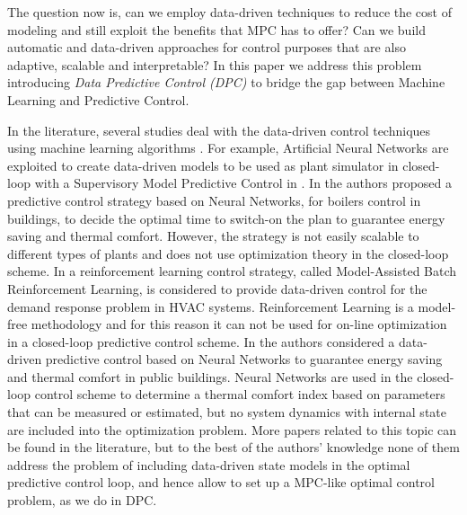 	
The question now is, can we employ data-driven techniques to reduce the cost of modeling and still exploit the benefits that MPC has to offer? Can we build automatic and data-driven approaches for control purposes that are also adaptive, scalable and interpretable? In this paper we address this problem introducing \textit{Data Predictive Control (DPC)} to bridge the gap between Machine Learning and Predictive Control.

In the literature, several studies deal with the data-driven control techniques using machine learning algorithms \cite{Hou2013}. For example, Artificial Neural Networks are exploited to create data-driven models to be used as plant simulator in closed-loop with a Supervisory Model Predictive Control in \cite{Afram2017}. In \cite{Macarulla2017} the authors proposed a predictive control strategy based on Neural Networks, for boilers control in buildings, to decide the optimal time to switch-on the plan to guarantee energy saving and thermal comfort. However, the strategy is not easily scalable to different types of plants and does not use optimization theory in the closed-loop scheme. In \cite{Costanzo2016} a reinforcement learning control strategy, called Model-Assisted Batch Reinforcement Learning, is considered to provide data-driven control for the demand response problem in HVAC systems. Reinforcement Learning is a model-free methodology and for this reason it can not be used for on-line optimization in a closed-loop predictive control scheme. In \cite{Ferreira2012} the authors considered a data-driven predictive control based on Neural Networks to guarantee energy saving and  thermal comfort in public buildings. Neural Networks are used in the closed-loop control scheme to determine a thermal comfort index based on parameters that can be measured or estimated, but no  system dynamics with internal state are included into the optimization problem. More papers related to this topic can be found in the literature, but to the best of the authors' knowledge none of them address the problem of including data-driven state models in the optimal predictive control loop, and hence allow to set up a MPC-like optimal control problem, as we do in DPC.


